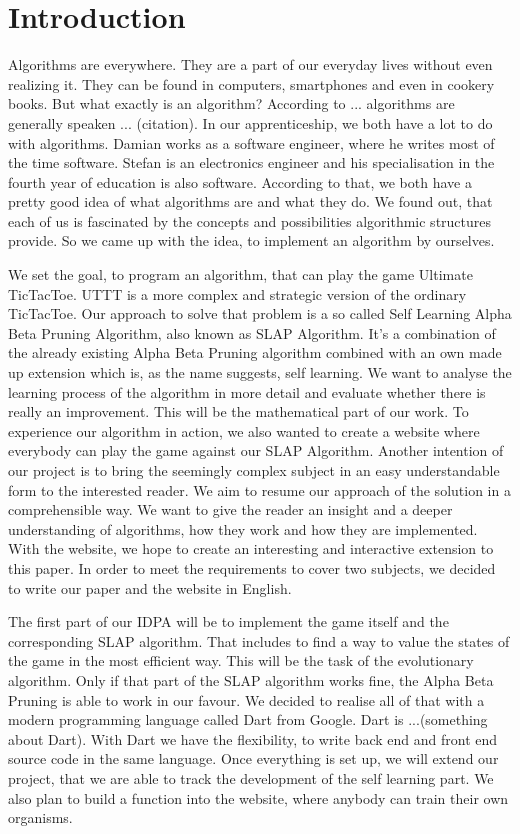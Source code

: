\section{Introduction}
Algorithms are everywhere. They are a part of our everyday lives without even realizing it. They can be found in computers, smartphones and even in cookery books. But what exactly is an algorithm? According to ... algorithms are generally speaken ... (citation).
In our apprenticeship, we both have a lot to do with algorithms. Damian works as a software engineer, where he writes most of the time software. Stefan is an electronics engineer and his specialisation in the fourth year of education is also software. According to that, we both have a pretty good idea of what algorithms are and what they do. We found out, that each of us is fascinated by the concepts and possibilities algorithmic structures provide. So we came up with the idea, to implement an algorithm by ourselves. 

We set the goal, to program an algorithm, that can play the game Ultimate TicTacToe. UTTT is a more complex and strategic version of the ordinary TicTacToe. 
Our approach to solve that problem is a so called Self Learning Alpha Beta Pruning Algorithm, also known as SLAP Algorithm. It's a combination of the already existing Alpha Beta Pruning algorithm combined with an own made up extension which is, as the name suggests, self learning. We want to analyse the learning process of the algorithm in more detail and evaluate whether there is really an improvement. This will be the mathematical part of our work.
To experience our algorithm in action, we also wanted to create a website where everybody can play the game against our SLAP Algorithm.
Another intention of our project is to bring the seemingly complex subject in an easy understandable form to the interested reader. We aim to resume our approach of the solution in a comprehensible way. We want to give the reader an insight and a deeper understanding of algorithms, how they work and how they are implemented. With the website, we hope to create an interesting and interactive extension to this paper.
In order to meet the requirements to cover two subjects, we decided to write our paper and the website in English.

The first part of our IDPA will be to implement the game itself and the corresponding SLAP algorithm. 
That includes to find a way to value the states of the game in the most efficient way. This will be the task of the evolutionary algorithm. Only if that part of the SLAP algorithm works fine, the Alpha Beta Pruning is able to work in our favour.
We decided to realise all of that with a modern programming language called Dart from Google. Dart is ...(something about Dart). With Dart we have the flexibility, to write back end and front end source code in the same language. Once everything is set up, we will extend our project, that we are able to track the development of the self learning part. We also plan to build a function into the website, where anybody can train their own organisms.



